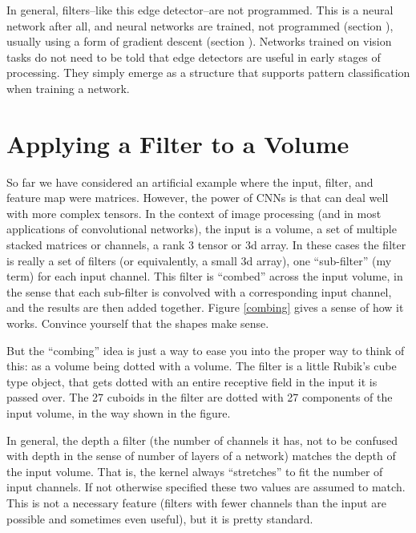 In general, filters--like this edge detector--are not programmed. This is a neural network after all, and neural networks are trained, not programmed (section ), usually using a form of gradient descent (section ). Networks trained on vision tasks do not need to be told that edge detectors are useful in early stages of processing. They simply emerge as a structure that supports pattern classification when training a network.

\section{Applying a Filter to a Volume}

So far we have considered an artificial example where the input, filter, and feature map were matrices. However, the power of CNNs is that can deal well with more complex tensors. In the context of image processing (and in most applications of convolutional networks), the input is a volume, a set of multiple stacked matrices or channels, a rank 3 tensor or 3d array.  In these cases the filter is really a set of filters (or equivalently, a small 3d array), one ``sub-filter'' (my term) for each input channel. This filter is ``combed'' across the input volume, in the sense that each sub-filter is convolved with a corresponding input channel, and the results are then added together. Figure \ref{combing} gives a sense of how it works. Convince yourself that the shapes make sense.

But the ``combing'' idea is just a way to ease you into the proper way to think of this: as a volume being dotted with a volume. The filter is a little Rubik's cube type object, that gets dotted with an entire receptive field in the input it is passed over. The 27 cuboids in the filter are dotted with 27 components of the input volume, in the way shown in the figure.

In general, the depth a filter (the number of channels it has, not to be confused with depth in the sense of number of layers of a network) matches the depth of the input volume. That is, the kernel always ``stretches'' to fit the number of input channels. If not otherwise specified these two values are assumed to match. This is not a necessary feature (filters with fewer channels than the input are possible and sometimes even useful), but it is pretty standard.

